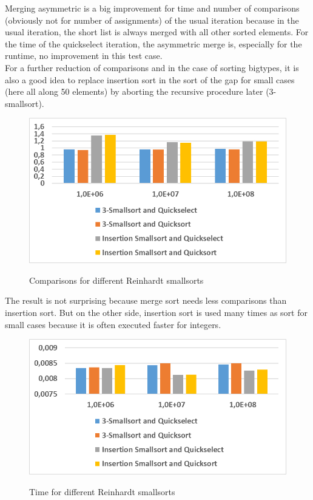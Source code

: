 \documentclass[11pt,pdftex,a4paper, twocolumn]{article}
\begin{document}
Merging asymmetric is a big improvement for time and number of comparisons (obviously not for number of assignments) of the usual iteration because in the usual iteration, the short list is always merged with all other sorted elements. For the time of the quickselect iteration, the asymmetric merge is, especially for the runtime, no improvement in this test case. \\
For a further reduction of comparisons and in the case of sorting bigtypes, it is also a good idea to replace insertion sort in the sort of the gap for small cases (here all along 50 elements) by aborting the recursive procedure later (3-smallsort). \\
\begin{figure}[H]
\includegraphics[width=\linewidth]{Diagramm-Bilder/comparisons-diff-iter-and-smallsorts.JPG} \\
\caption{Comparisons for different Reinhardt smallsorts} \label{fig:comparisons-diff-iter-and-smallsorts}
\end{figure}
The result is not surprising because merge sort needs less comparisons than insertion sort. But on the other side, insertion sort is used many times as sort for small cases because it is often executed faster for integers. \\
\begin{figure}[H]
\includegraphics[width=\linewidth]{Diagramm-Bilder/time-diff-iter-and-smallsorts.JPG} \\
\caption{Time for different Reinhardt smallsorts} \label{fig:time-diff-iter-and-smallsorts}
\end{figure}
\end{document}
